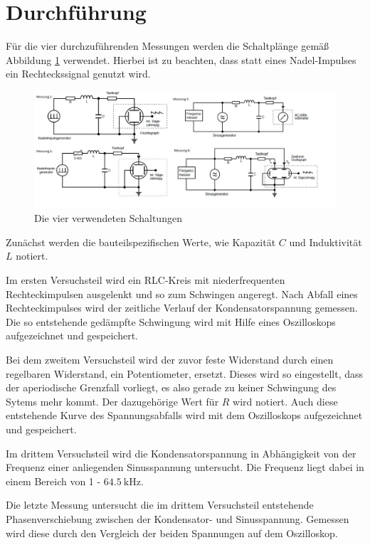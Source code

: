 \section{Durchführung}
\label{sec:Durchführung}

Für die vier durchzuführenden Messungen werden die Schaltplänge gemäß
Abbildung \ref{fig:Aufbau} verwendet. Hierbei ist zu beachten, dass statt eines 
Nadel-Impulses ein Rechteckssignal genutzt wird. 

\begin{figure}
  \centering
  \includegraphics[scale=0.4]{content/Aufbau_Schaltungen.jpg}
  \caption{Die vier verwendeten Schaltungen}
  \label{fig:Aufbau}
\end{figure}

Zunächst werden die bauteilspezifischen Werte, wie Kapazität $C$
und Induktivität $L$ notiert. 

Im ersten Versuchsteil wird ein RLC-Kreis mit niederfrequenten 
Rechteckimpulsen ausgelenkt und so zum Schwingen angeregt. Nach Abfall
eines Rechteckimpulses wird der zeitliche Verlauf der Kondensatorspannung
gemessen. Die so entstehende gedämpfte Schwingung wird mit Hilfe eines
Oszilloskops aufgezeichnet und gespeichert. 

Bei dem zweitem Versuchsteil wird der zuvor feste Widerstand durch einen 
regelbaren Widerstand, ein Potentiometer, ersetzt. Dieses wird so eingestellt, 
dass der aperiodische Grenzfall vorliegt, es also gerade zu keiner Schwingung des 
Sytems mehr kommt. Der dazugehörige Wert für $R$ wird notiert. Auch diese 
entstehende Kurve des Spannungsabfalls wird mit dem Oszilloskops aufgezeichnet 
und gespeichert. 

Im drittem Versuchsteil wird die Kondensatorspannung in Abhängigkeit von 
der Frequenz einer anliegenden Sinusspannung untersucht. Die Frequenz
liegt dabei in einem Bereich von 1 - $\SI{64.5}{\kilo\hertz}$. 

Die letzte Messung untersucht die im drittem Versuchsteil entstehende 
Phasenverschiebung zwischen der Kondensator- und Sinusspannung. Gemessen 
wird diese durch den Vergleich der beiden Spannungen auf dem Oszilloskop. 


